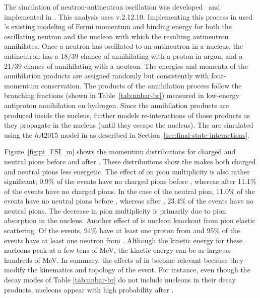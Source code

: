 The simulation of neutron-antineutron oscillation was developed~\cite{Hewes:2017xtr} and implemented in . This analysis uses  v.2.12.10.
Implementing this process in  used 's existing modeling of Fermi momentum and binding energy for both the oscillating neutron and the nucleon with which the resulting antineutron annihilates.   Once a neutron has oscillated to an antineutron in a nucleus, the antineutron has a $18/39$ chance of annihilating with a proton in argon, and a $21/39$ chance of annihilating with a neutron. The energies and momenta of the annihilation products are assigned randomly but consistently with four-momentum conservation. The products of the annihilation process follow the branching fractions (shown in Table~\ref{tab:nnbar-br}) measured in low-energy antiproton annihilation on hydrogen.
Since the annihilation products are produced inside the nucleus,  further models re-interactions of those products as they propagate in the nucleus (until they escape the nucleus).  The  are simulated using the $hA2015$ model in  as described in Section~\ref{sec:final-state-interactions}.

Figure~\ref{fig:pi_FSI_m} shows the momentum distributions for charged and neutral pions before  and after . These distributions show the  makes both charged and neutral pions less energetic.  The effect of  on pion multiplicity is also rather significant; \num{0.9}\% of the events have no charged pions before , whereas after  \num{11.1}\% of the events have no charged pions. In the case of the neutral pion, \num{11.0}\% of the events have no neutral pions before , whereas after , \num{23.4}\% of the events have no neutral pions. The decrease in pion multiplicity is primarily due to pion absorption in the nucleus. Another effect of  is nucleon knockout from pion elastic scattering. Of the events, \num{94}\% have at least one proton from  and \num{95}\% of the events have at least one neutron from . Although the kinetic energy for these nucleons peak at a few tens of \si{\MeV}, the kinetic energy can be as large as hundreds of \si{\MeV}.  In summary, the effects of  in \nnbar become relevant because they modify the kinematics and topology of the event. For instance, even though the decay modes of Table \ref{tab:nnbar-br} do not include nucleons in their decay products, nucleons appear with high probability after .

